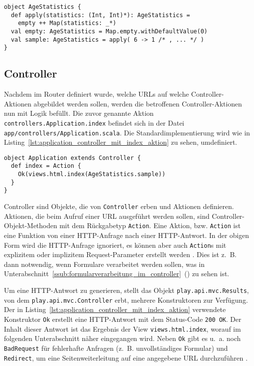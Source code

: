 \begin{lstlisting}[caption=Das AgeStatistics-Hilfsobjekt, label=lst:das_agestatistics_hilfsobjekt]
object AgeStatistics {
  def apply(statistics: (Int, Int)*): AgeStatistics =
    empty ++ Map(statistics: _*)
  val empty: AgeStatistics = Map.empty.withDefaultValue(0)
  val sample: AgeStatistics = apply( 6 -> 1 /* , ... */ )
}
\end{lstlisting}



\subsection{Controller} %
\label{sub:controller}

Nachdem im Router definiert wurde, welche URLs auf welche Controller-Aktionen abgebildet werden sollen, werden die betroffenen Controller-Aktionen nun mit Logik befüllt.
Die zuvor genannte Aktion \lstinline[breaklines=true]|controllers.Application.index| befindet sich in der Datei \lstinline[breaklines=true]|app/controllers/Application.scala|.
Die Standardimplementierung wird wie in Listing~\ref{lst:application_controller_mit_index_aktion} zu sehen, umdefiniert.

\begin{lstlisting}[caption=Der Application-Controller mit index-Aktion, label=lst:application_controller_mit_index_aktion]
object Application extends Controller {
  def index = Action {
    Ok(views.html.index(AgeStatistics.sample))
  }
}
\end{lstlisting}

Controller sind Objekte, die von \lstinline|Controller| erben und Aktionen definieren.
Aktionen, die beim Aufruf einer URL ausgeführt werden sollen, sind Controller-Objekt-Methoden mit dem Rückgabetyp \lstinline|Action|.
Eine Aktion, bzw. \lstinline|Action| ist eine Funktion von einer HTTP-Anfrage nach einer HTTP-Antwort.
In der obigen Form wird die HTTP-Anfrage ignoriert, es können aber auch \lstinline|Action|s mit explizitem oder implizitem Request-Parameter erstellt werden \cite[vgl.][]{play_controllers}.
Dies ist z.~B. dann notwendig, wenn Formulare verarbeitet werden sollen, was in Unterabschnitt~\ref{ssub:formularverarbeitung_im_controller}~() zu sehen ist.

Um eine HTTP-Antwort zu generieren, stellt das Objekt \lstinline|play.api.mvc.Results|, von dem \lstinline|play.api.mvc.Controller| erbt, mehrere Konstruktoren zur Verfügung.
Der in Listing~\ref{lst:application_controller_mit_index_aktion} verwendete Konstruktor \lstinline|Ok| erstellt eine HTTP-Antwort mit dem Status-Code \lstinline|200 OK|.
Der Inhalt dieser Antwort ist das Ergebnis der View \lstinline|views.html.index|, worauf im folgenden Unterabschnitt näher eingegangen wird.
Neben \lstinline|Ok| gibt es u.~a. noch \lstinline|BadRequest| für fehlerhafte Anfragen (z.~B. unvollständiges Formular) und \lstinline|Redirect|, um eine Seitenweiterleitung auf eine angegebene URL durchzuführen \cite[vgl.][]{play_controllers}.

